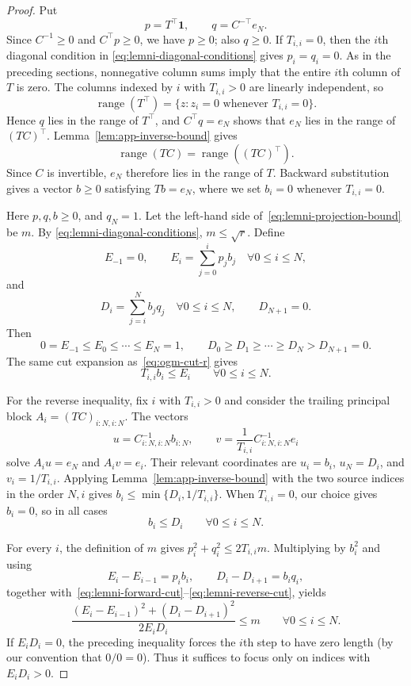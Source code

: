 \documentclass[10pt,a4paper]{amsart}
\begin{document}
\begin{proof}
Put
\[
    p=T^\top\mathbf1,
    \qquad
    q=C^{-\top}e_N.
\]
Since $C^{-1}\geq0$ and $C^\top p\geq0$, we have $p\geq0$; also $q\geq0$.
If $T_{i,i}=0$, then the $i$th diagonal condition in
\eqref{eq:lemni-diagonal-conditions} gives $p_i=q_i=0$. As in the preceding
sections, nonnegative column sums imply that the entire $i$th column of $T$ is
zero. The columns indexed by $i$ with $T_{i,i}>0$ are linearly independent, so
\[
    \operatorname{range}(T^\top)
    =\{z:z_i=0\text{ whenever }T_{i,i}=0\}.
\]
Hence $q$ lies in the range of $T^\top$, and $C^\top q=e_N$ shows that
$e_N$ lies in the range of $(TC)^\top$. Lemma~\ref{lem:app-inverse-bound}
gives
\[
\operatorname{range}(TC)=\operatorname{range}((TC)^\top).
\]
Since $C$ is invertible, $e_N$ therefore lies in the range of $T$.
Backward substitution gives a vector $b\geq0$ satisfying $Tb=e_N$, where we
set $b_i=0$ whenever $T_{i,i}=0$.

Here $p,q,b\geq0$, and $q_N=1$. Let the left-hand side
of~\eqref{eq:lemni-projection-bound} be $m$. By
\eqref{eq:lemni-diagonal-conditions}, $m\leq\sqrt r$. Define
\[
    E_{-1}=0,
    \qquad
    E_i=\sum_{j=0}^i p_jb_j
    \quad \forall 0\leq i\leq N,
\]
and
\[
    D_i=\sum_{j=i}^N b_jq_j
    \quad \forall 0\leq i\leq N,
    \qquad
    D_{N+1}=0.
\]
Then
\[
    0=E_{-1}\leq E_0\leq\cdots\leq E_N=1,
    \qquad
    D_0\geq D_1\geq\cdots\geq D_N>D_{N+1}=0.
\]
The same cut expansion as~\eqref{eq:ogm-cut-r} gives
\begin{equation}\label{eq:lemni-forward-cut}
    T_{i,i}b_i\leq E_i
    \qquad \forall 0\leq i\leq N.
\end{equation}

For the reverse inequality, fix $i$ with $T_{i,i}>0$ and consider
the trailing principal block $A_i=(TC)_{i:N,i:N}$. The vectors
\[
u=C_{i:N,i:N}^{-1}b_{i:N},
\qquad
v=\frac1{T_{i,i}}C_{i:N,i:N}^{-1}e_i
\]
solve $A_iu=e_N$ and $A_iv=e_i$. Their relevant coordinates are
$u_i=b_i$, $u_N=D_i$, and $v_i=1/T_{i,i}$.
Applying Lemma~\ref{lem:app-inverse-bound} with the two source indices in the
order $N,i$ gives
$b_i\leq\min\{D_i,1/T_{i,i}\}$. When
$T_{i,i}=0$, our choice gives $b_i=0$, so in all cases
\begin{equation}\label{eq:lemni-reverse-cut}
    b_i\leq D_i
    \qquad \forall 0\leq i\leq N.
\end{equation}

For every $i$, the definition of $m$ gives $p_i^2+q_i^2\leq2T_{i,i}m$.
Multiplying by $b_i^2$ and using
\[
    E_i-E_{i-1}=p_ib_i,
    \qquad
    D_i-D_{i+1}=b_iq_i,
\]
together with~\eqref{eq:lemni-forward-cut}--\eqref{eq:lemni-reverse-cut},
yields
\begin{equation}\label{eq:lemni-path-inequality}
    \frac{(E_i-E_{i-1})^2+(D_i-D_{i+1})^2}
    {2E_iD_i}
    \leq m
    \qquad \forall 0\leq i\leq N.
\end{equation}
If $E_iD_i=0$, the preceding inequality forces the $i$th
step to have zero length (by our convention that $0/0=0$). Thus it suffices to focus only on indices with $E_iD_i>0$.


\end{proof}
\end{document}
